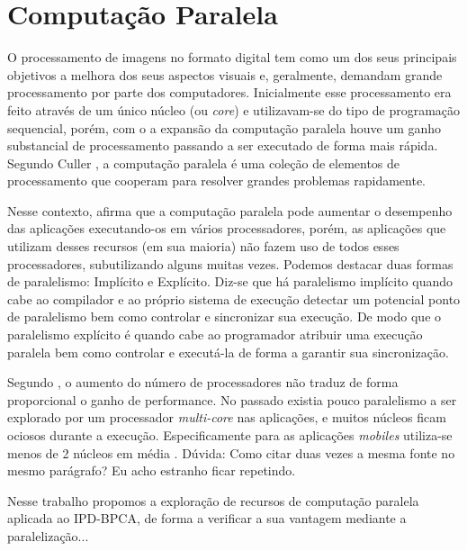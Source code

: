 \section{Computação Paralela}

O processamento de imagens no formato digital tem como um dos seus principais objetivos a melhora dos seus aspectos visuais e, geralmente, demandam grande processamento por parte dos computadores. Inicialmente esse processamento era feito através de um único núcleo (ou \textit{core}) e utilizavam-se do tipo de programação sequencial, porém, com o a expansão da computação paralela houve um ganho substancial de processamento passando a ser executado de forma mais rápida. Segundo Culler \cite{culler1999parallel}, a computação paralela  é uma coleção de elementos de processamento que cooperam para resolver grandes problemas rapidamente.

Nesse contexto, \cite{diaz2012survey} afirma que a computação paralela pode aumentar o desempenho das aplicações executando-os em vários processadores, porém, as aplicações que utilizam desses recursos (em sua maioria) não fazem uso de todos esses processadores, subutilizando alguns muitas vezes. Podemos destacar duas formas de paralelismo: Implícito e Explícito. Diz-se que há paralelismo implícito quando cabe ao compilador e ao próprio sistema de execução detectar um potencial ponto de paralelismo bem como controlar e sincronizar sua execução. De modo que o paralelismo explícito é quando cabe ao programador atribuir uma execução paralela bem como controlar e executá-la de forma a garantir sua sincronização.

Segundo \cite{gao2015study}, o aumento do número de processadores não traduz de forma proporcional o ganho de performance. No passado existia pouco paralelismo a ser  explorado por um processador \textit{multi-core} nas aplicações, e muitos núcleos ficam ociosos durante a execução. Especificamente para as aplicações \textit{mobiles} utiliza-se menos de 2 núcleos em média \cite{gao2015study}. {\color{red} Dúvida: Como citar duas vezes a mesma fonte no mesmo parágrafo? Eu acho estranho ficar repetindo.}

Nesse trabalho propomos a exploração de recursos de computação paralela aplicada ao IPD-BPCA, de forma a verificar a sua vantagem mediante a paralelização...


